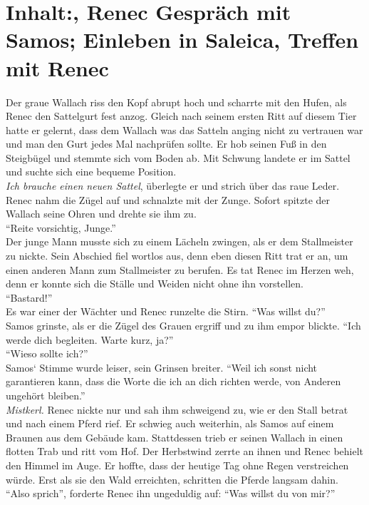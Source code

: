 \chapter{Inhalt:, Renec Gespräch mit Samos; Einleben in Saleica, Treffen mit Renec}

Der graue Wallach riss den Kopf abrupt hoch und scharrte mit den Hufen, als Renec den Sattelgurt 
fest anzog. Gleich nach seinem ersten Ritt auf diesem Tier hatte er gelernt, dass dem Wallach was 
das Satteln anging nicht zu vertrauen war und man den Gurt jedes Mal nachprüfen sollte. Er hob 
seinen Fuß in den Steigbügel und stemmte sich vom Boden ab. Mit Schwung landete er im Sattel und 
suchte sich eine bequeme Position. \\
\textit{Ich brauche einen neuen Sattel}, überlegte er und strich über das raue Leder.\\
Renec nahm die Zügel auf und schnalzte mit der Zunge. Sofort spitzte der Wallach seine Ohren und 
drehte sie ihm zu.\\
``Reite vorsichtig, Junge.''\\
Der junge Mann musste sich zu einem Lächeln zwingen, als er dem Stallmeister zu nickte. Sein 
Abschied fiel wortlos aus, denn eben diesen Ritt trat er an, um einen anderen Mann zum Stallmeister 
zu berufen. Es tat Renec im Herzen weh, denn er konnte sich die Ställe und Weiden nicht ohne ihn 
vorstellen.\\
``Bastard!''\\
Es war einer der Wächter und Renec runzelte die Stirn. ``Was willst du?''\\
Samos grinste, als er die Zügel des Grauen ergriff und zu ihm empor blickte. ``Ich werde dich 
begleiten. Warte kurz, ja?''\\
``Wieso sollte ich?''\\
Samos‘ Stimme wurde leiser, sein Grinsen breiter. ``Weil ich sonst nicht garantieren kann, dass die 
Worte die ich an dich richten werde, von Anderen ungehört bleiben.''\\
\textit{Mistkerl.}
Renec nickte nur und sah ihm schweigend zu, wie er den Stall betrat und nach einem Pferd rief. Er 
schwieg auch weiterhin, als Samos auf einem Braunen aus dem Gebäude kam. Stattdessen trieb er 
seinen Wallach in einen flotten Trab und ritt vom Hof. Der Herbstwind zerrte an ihnen und Renec 
behielt den Himmel im Auge. Er hoffte, dass der heutige Tag ohne Regen verstreichen würde. Erst als 
sie den Wald erreichten, schritten die Pferde langsam dahin.\\
``Also sprich'', forderte Renec ihn ungeduldig auf: ``Was willst du von mir?''\\
